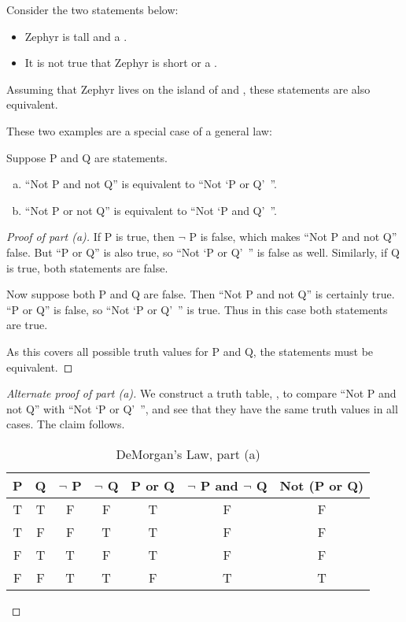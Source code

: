 \documentclass{tufte-book}
\begin{document}
\begin{example}
  Consider the two statements below:
  \begin{itemize}
      \item Zephyr is tall and a \knave.
      \item It is not true that Zephyr is short or a \knight.
  \end{itemize}
  Assuming that Zephyr lives on the island of \knights and \knaves, these statements are also equivalent.
\end{example}

These two examples are a special case of a general law:
\begin{theorem}
  Suppose P and Q are statements.
  \begin{enumerate}[(a)]
      \item ``Not P and not Q'' is equivalent to ``Not `P or Q'~''.
      \item ``Not P or not Q'' is equivalent to ``Not `P and Q'~''.
  \end{enumerate}
\end{theorem}

\begin{proof}[Proof of part (a)]
  If P is true, then $\neg$ P is false, which makes ``Not P and not Q'' false. But ``P or Q'' is also true, so ``Not `P or Q'~'' is false as well. Similarly, if Q is true, both statements are false.

  Now suppose both P and Q are false. Then ``Not P and not Q'' is certainly true. ``P or Q'' is false, so ``Not `P or Q'~'' is true. Thus in this case both statements are true.

  As this covers all possible truth values for P and Q, the statements must be equivalent.
\end{proof}

\begin{proof}[Alternate proof of part (a)]
  We construct a truth table, , to compare ``Not P and not Q'' with ``Not `P or Q'~'', and see that they have the same truth values in all cases. The claim follows.
  \begin{table}
    \centering
    \begin{tabular}{ccccccc}
      \toprule
      P & Q & $\neg$ P & $\neg$ Q & P or Q & $\neg$ P and $\neg$ Q & Not (P or Q) \\ \midrule 
      T & T & F & F & T & F & F\\
      T & F & F & T & T & F & F\\
      F & T & T & F & T & F & F\\
      F & F & T & T & F & T & T\\
      \bottomrule
    \end{tabular}
    \caption{DeMorgan's Law, part (a)}
    \label{tab:demorgan-a}
  \end{table}  
\end{proof}
\end{document}

